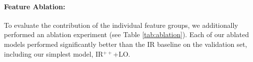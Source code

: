
\paragraph{Feature Ablation:} To evaluate the contribution of the individual feature groups, we additionally performed an ablation experiment (see Table \ref{tab:ablation}).
Each of our ablated models performed significantly better than the IR baseline on the validation set, including our simplest model, IR$^{++}$+LO.
   



